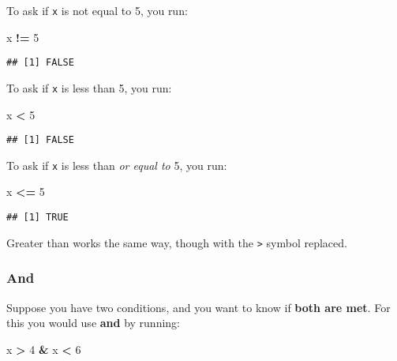 \documentclass[]{book}
\newenvironment{Shaded}{\begin{snugshade}}{\end{snugshade}}
\newcommand{\DecValTok}[1]{\textcolor[rgb]{0.00,0.00,0.81}{#1}}
\newcommand{\StringTok}[1]{\textcolor[rgb]{0.31,0.60,0.02}{#1}}
\newcommand{\OperatorTok}[1]{\textcolor[rgb]{0.81,0.36,0.00}{\textbf{#1}}}
\newcommand{\NormalTok}[1]{#1}
\theoremstyle{definition}
\theoremstyle{definition}
\theoremstyle{definition}
\theoremstyle{remark}
\begin{document}
To ask if \texttt{x} is not equal to 5, you run:

\begin{Shaded}
\begin{Highlighting}[]
\NormalTok{x }\OperatorTok{!=}\StringTok{ }\DecValTok{5}
\end{Highlighting}
\end{Shaded}

\begin{verbatim}
## [1] FALSE
\end{verbatim}

To ask if \texttt{x} is less than 5, you run:

\begin{Shaded}
\begin{Highlighting}[]
\NormalTok{x }\OperatorTok{<}\StringTok{ }\DecValTok{5}
\end{Highlighting}
\end{Shaded}

\begin{verbatim}
## [1] FALSE
\end{verbatim}

To ask if \texttt{x} is less than \emph{or equal to} 5, you run:

\begin{Shaded}
\begin{Highlighting}[]
\NormalTok{x }\OperatorTok{<=}\StringTok{ }\DecValTok{5}
\end{Highlighting}
\end{Shaded}

\begin{verbatim}
## [1] TRUE
\end{verbatim}

Greater than works the same way, though with the \texttt{\textgreater{}}
symbol replaced.

\subsubsection*{And}\label{and}

Suppose you have two conditions, and you want to know if \textbf{both
are met}. For this you would use \textbf{and} by running:

\begin{Shaded}
\begin{Highlighting}[]
\NormalTok{x }\OperatorTok{>}\StringTok{ }\DecValTok{4} \OperatorTok{&}\StringTok{ }\NormalTok{x }\OperatorTok{<}\StringTok{ }\DecValTok{6}
\end{Highlighting}
\end{Shaded}
\end{document}
